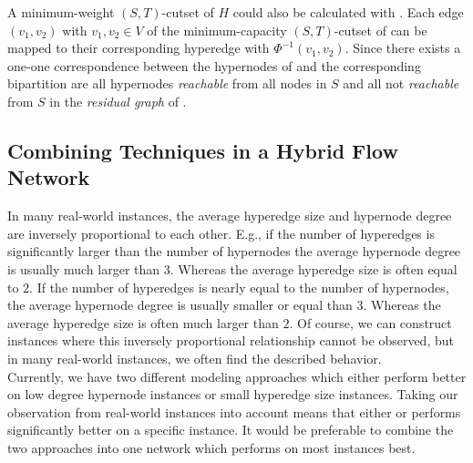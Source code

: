 A minimum-weight $(S,T)$-cutset of $H$ could also be calculated with . 
Each edge $(v_1,v_2)$ with $v_1,v_2 \in V$ of the minimum-capacity
$(S,T)$-cutset of  can be mapped to their corresponding hyperedge
with $\Phi^{-1}(v_1,v_2)$. Since there exists a one-one correspondence between the hypernodes
of  and  the corresponding bipartition are all hypernodes \emph{reachable}
from all nodes in $S$ and all not \emph{reachable} from $S$ in the \emph{residual graph}
of . 

\subsection{Combining Techniques in a Hybrid Flow Network}
\label{sec:hybrid_network}

In many real-world instances, the average hyperedge size and hypernode degree are inversely
proportional to each other. E.g., if the number of hyperedges is significantly larger than the
number of hypernodes the average hypernode degree is usually much larger than $3$. Whereas
the average hyperedge size is often equal to $2$. If the number of hyperedges is nearly equal
to the number of hypernodes, the average hypernode degree is usually smaller or equal than $3$. Whereas
the average hyperedge size is often much larger than $2$. Of course, we can construct instances
where this inversely proportional relationship cannot be observed, but in many real-world instances,
we often find the described behavior. \\
Currently, we have two different modeling approaches which either perform better on low degree
hypernode instances or small hyperedge size instances. Taking our observation from real-world instances 
into account means that either  or  performs significantly better on
a specific instance. It would be preferable to combine the two approaches into one network 
which performs on most instances best. \\

